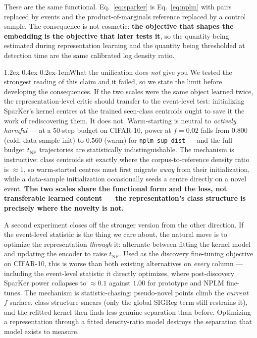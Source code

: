 \documentclass{article}
\makeatletter
\renewcommand\paragraph{\@startsection{paragraph}{4}{\z@}%
  {1.2ex \@plus 0.4ex \@minus 0.2ex}{-1em}{\normalsize\bf}}
\makeatother
\begin{document}
These are the same functional. Eq.~\eqref{eq:sparker} is
Eq.~\eqref{eq:nplm} with pairs replaced by events and the product-of-marginals
reference replaced by a control sample. The consequence is not cosmetic:
\textbf{the objective that shapes the embedding is the objective that later
tests it}, so the quantity being estimated during representation learning and
the quantity being thresholded at detection time are the same calibrated log
density ratio.

\paragraph{What the unification does \emph{not} give you}
We tested the strongest reading of this claim and it failed, so we state the
limit before developing the consequences. If the two scales were the same
object learned twice, the representation-level critic should transfer to the
event-level test: initializing SparKer's kernel centres at the trained
seen-class centroids ought to save it the work of rediscovering them. It does
not. Warm-starting is neutral to \emph{actively harmful} --- at a 50-step
budget on CIFAR-10, power at $f{=}0.02$ falls from $0.800$ (cold, data-sample
init) to $0.560$ (warm) for \texttt{nplm\_sup\_dist} --- and the full-budget
$t_{\mathrm{NP}}$ trajectories are statistically indistinguishable. The
mechanism is instructive: class centroids sit exactly where the
corpus-to-reference density ratio is $\approx1$, so warm-started centres must
first migrate \emph{away} from their initialization, while a data-sample
initialization occasionally seeds a centre directly on a novel event.
\textbf{The two scales share the functional form and the loss, not transferable
learned content --- the representation's class structure is precisely where the
novelty is not.}

A second experiment closes off the stronger version from the other direction.
If the event-level statistic is the thing we care about, the natural move is to
optimize the representation \emph{through} it: alternate between fitting the
kernel model and updating the encoder to raise $t_{\mathrm{NP}}$. Used as the
discovery fine-tuning objective on CIFAR-10, this is worse than both existing
alternatives on \emph{every} column --- including the event-level statistic it
directly optimizes, where post-discovery SparKer power collapses to $\approx0.1$
against $1.00$ for prototype and NPLM fine-tunes. The mechanism is
statistic-chasing: pseudo-novel points climb the \emph{current} $f$ surface,
class structure smears (only the global SIGReg term still restrains it), and the
refitted kernel then finds less genuine separation than before. Optimizing a
representation through a fitted density-ratio model destroys the separation that
model exists to measure.
\end{document}
